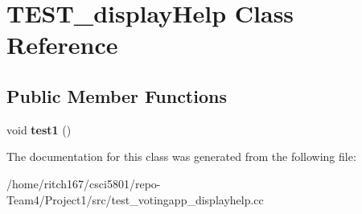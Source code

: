 \hypertarget{classTEST__displayHelp}{}\section{T\+E\+S\+T\+\_\+display\+Help Class Reference}
\label{classTEST__displayHelp}
\subsection*{Public Member Functions}
\begin{DoxyCompactItemize}
\item 
\mbox{\label{classTEST__displayHelp_a1ab965265ca9a2b658be646483e778e9}} 
void {\bfseries test1} ()
\end{DoxyCompactItemize}


The documentation for this class was generated from the following file\+:\begin{DoxyCompactItemize}
\item 
/home/ritch167/csci5801/repo-\/\+Team4/\+Project1/src/test\+\_\+votingapp\+\_\+displayhelp.\+cc\end{DoxyCompactItemize}
